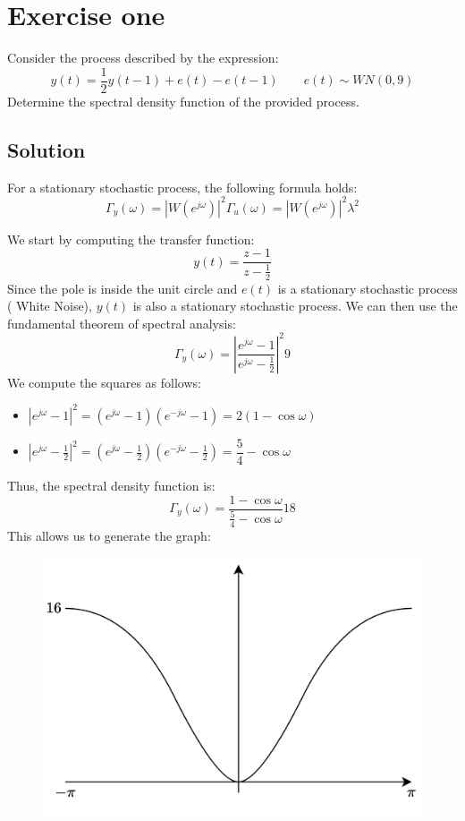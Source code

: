 \section{Exercise one}

Consider the process described by the expression:
\[y(t)=\dfrac{1}{2}y(t-1)+e(t)-e(t-1) \qquad e(t) \sim WN(0,9)\]
Determine the spectral density function of the provided process.

\subsection*{Solution}
For a stationary stochastic process, the following formula holds:
\[\Gamma_y(\omega)=\left\lvert W(e^{j\omega})\right\rvert^2 \Gamma_u(\omega) = \left\lvert W(e^{j\omega})\right\rvert^2 \lambda^2\]

We start by computing the transfer function:
\[y(t)=\dfrac{z-1}{z-\frac{1}{2}}\]
Since the pole is inside the unit circle and $e(t)$ is a stationary stochastic process ( White Noise), $y(t)$ is also a stationary stochastic process.
We can then use the fundamental theorem of spectral analysis:
\[\Gamma_y(\omega) = \left\lvert \dfrac{e^{j\omega}-1}{e^{j\omega}-\frac{1}{2}}\right\rvert^2 9\]
We compute the squares as follows:
\begin{itemize}
    \item $\left\lvert e^{j\omega}-1 \right\rvert^2=\left( e^{j\omega}-1 \right)\left( e^{-j\omega}-1 \right)=2(1-\cos\omega)$
    \item $\left\lvert e^{j\omega}-\frac{1}{2}\right\rvert^2=\left( e^{j\omega}-\frac{1}{2} \right)\left( e^{-j\omega}-\frac{1}{2} \right)=\dfrac{5}{4}-\cos\omega$
\end{itemize}
Thus, the spectral density function is:
\[\Gamma_y(\omega) = \dfrac{1-\cos\omega}{\frac{5}{4}-\cos\omega} 18\]
This allows us to generate the graph:
\begin{figure}[H]
    \centering
    \includegraphics[width=0.4\linewidth]{images/spec.png}
\end{figure}